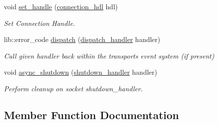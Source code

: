 \begin{DoxyCompactItemize}
void \mbox{\hyperlink{classwebsocketpp_1_1transport_1_1stub_1_1connection_a3a175c59ccb7b7ce630ab6441db8dba7}{set\+\_\+handle}} (\mbox{\hyperlink{namespacewebsocketpp_a6b3d26a10ee7229b84b776786332631d}{connection\+\_\+hdl}} hdl)
\begin{DoxyCompactList}\small\item\em Set Connection Handle. \end{DoxyCompactList}\item 
lib\+::error\+\_\+code \mbox{\hyperlink{classwebsocketpp_1_1transport_1_1stub_1_1connection_a8a02eae7fd9209b0c953feb931dc781c}{dispatch}} (\mbox{\hyperlink{namespacewebsocketpp_1_1transport_a6658447b2e10f4c712dd792aad0e0c78}{dispatch\+\_\+handler}} handler)
\begin{DoxyCompactList}\small\item\em Call given handler back within the transport\textquotesingle{}s event system (if present) \end{DoxyCompactList}\item 
void \mbox{\hyperlink{classwebsocketpp_1_1transport_1_1stub_1_1connection_ac6a43b32fd72e5d51e175f9431d314da}{async\+\_\+shutdown}} (\mbox{\hyperlink{namespacewebsocketpp_1_1transport_af39aff6fc4cb76f7df0d5322b734d156}{shutdown\+\_\+handler}} handler)
\begin{DoxyCompactList}\small\item\em Perform cleanup on socket shutdown\+\_\+handler. \end{DoxyCompactList}\end{DoxyCompactItemize}


\subsection{Member Function Documentation}
\mbox{\label{classwebsocketpp_1_1transport_1_1stub_1_1connection_a531a99546f52fee1c34c699f9c742348}} 
